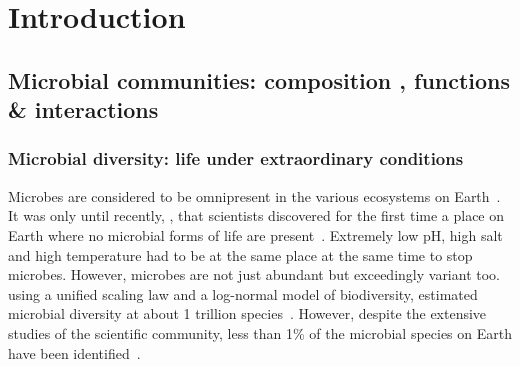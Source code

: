 \chapter{Introduction}
\label{cha:intro}



\section{Microbial communities: composition 
, functions 
\& interactions 
}
   \subsection{Microbial diversity: life under extraordinary conditions}
   \label{subsec:microbial_diversity}

      Microbes are considered to be omnipresent in the 
      various ecosystems on Earth~\citep{falkowski2008microbial}.
      It was only until recently, \citeyear{belilla2019hyperdiverse}, that scientists discovered for the first time 
      a place on Earth where no microbial forms of life are present~\cite{belilla2019hyperdiverse}.
      Extremely low pH, high salt and high temperature had to be 
      at the same place at the same time to stop microbes.
      However, microbes are not just abundant but 
      exceedingly variant too.
      \citeauthor{locey2016scaling} using a unified scaling law
      and a log-normal model of biodiversity, 
      estimated microbial diversity at about 1 trillion species~\cite{locey2016scaling}.
      However, despite the extensive studies of the scientific community, 
      less than 1\% of the microbial species on Earth have been identified~\cite{isme}.
      
